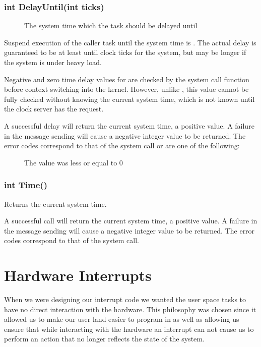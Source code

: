 \documentclass[pdftex,10pt,a4paper]{article}
\begin{document}
\subsubsection*{int DelayUntil(int ticks)}

\begin{description}
\item[] The system time which the task should be delayed
  until
\end{description}

Suspend execution of the caller task until the system time is .
The actual delay is guaranteed to be at least until 
clock ticks for the system, but may be longer if the system is under
heavy load.

Negative and zero time delay values for  are checked by the
system call function before context switching into the
kernel. However, unlike , this value cannot be fully
checked without knowing the current system time, which is not known
until the clock server has the request.

A successful delay will return the current system time, a positive
value. A failure in the message sending will cause a negative integer
value to be returned. The error codes correspond to that of the
 system call or are one of the following:

\begin{description}
\item[] The  value was less or
  equal to $0$
\end{description}


\subsubsection*{int Time()}

Returns the current system time.

A successful call will return the current system time, a positive
value. A failure in the message sending will cause a negative integer
value to be returned. The error codes correspond to that of the
 system call.


\section*{Hardware Interrupts}

When we were designing our interrupt code we wanted the user space tasks to
have no direct interaction with the hardware. This philosophy was chosen since
it allowed us to make our user land easier to program in as well as allowing us
ensure that while interacting with the hardware an interrupt can not cause us
to perform an action that no longer reflects the state of the system.
\end{document}
